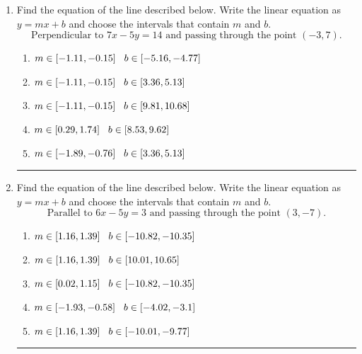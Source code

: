 \documentclass[14pt]{extbook}
\newcommand{\litem}[1]{\item#1\hspace*{-1cm}\rule{\textwidth}{0.4pt}}
\begin{document}
\begin{enumerate}
{\begin{enumerate}[label=\Alph*.]
\end{enumerate} }
\litem{
Find the equation of the line described below. Write the linear equation as $ y=mx+b $ and choose the intervals that contain $m$ and $b$.\[ \text{Perpendicular to } 7 x - 5 y = 14 \text{ and passing through the point } (-3, 7). \]\begin{enumerate}[label=\Alph*.]
\item \( m \in [-1.11, -0.15] \hspace*{3mm} b \in [-5.16, -4.77] \)
\item \( m \in [-1.11, -0.15] \hspace*{3mm} b \in [3.36, 5.13] \)
\item \( m \in [-1.11, -0.15] \hspace*{3mm} b \in [9.81, 10.68] \)
\item \( m \in [0.29, 1.74] \hspace*{3mm} b \in [8.53, 9.62] \)
\item \( m \in [-1.89, -0.76] \hspace*{3mm} b \in [3.36, 5.13] \)

\end{enumerate} }
\litem{
Find the equation of the line described below. Write the linear equation as $ y=mx+b $ and choose the intervals that contain $m$ and $b$.\[ \text{Parallel to } 6 x - 5 y = 3 \text{ and passing through the point } (3, -7). \]\begin{enumerate}[label=\Alph*.]
\item \( m \in [1.16, 1.39] \hspace*{3mm} b \in [-10.82, -10.35] \)
\item \( m \in [1.16, 1.39] \hspace*{3mm} b \in [10.01, 10.65] \)
\item \( m \in [0.02, 1.15] \hspace*{3mm} b \in [-10.82, -10.35] \)
\item \( m \in [-1.93, -0.58] \hspace*{3mm} b \in [-4.02, -3.1] \)
\item \( m \in [1.16, 1.39] \hspace*{3mm} b \in [-10.01, -9.77] \)


\end{enumerate}}
\end{enumerate}
\end{document}
